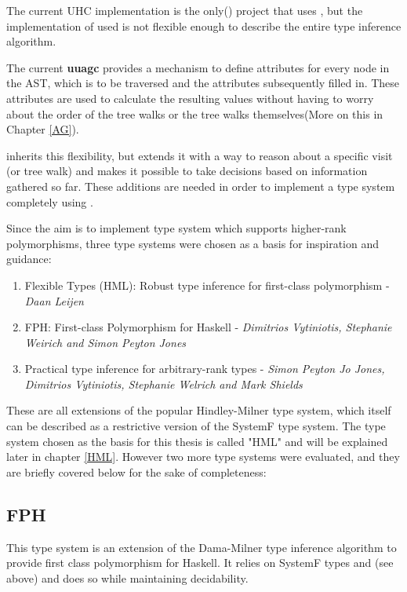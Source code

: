 The current UHC implementation is the only(\cite{UHC}) project that uses \ags, but the implementation of \ags used is not flexible enough to describe the entire type inference algorithm.

The current \textbf{uuagc} provides a mechanism to define attributes for every node in the AST, which is to be traversed and the attributes subsequently filled in. These attributes are used to calculate the resulting values without having to worry about the order of the tree walks or the tree walks themselves(More on this in Chapter \ref{AG}).

\Rcore inherits this flexibility, but extends it with a way to reason about a specific visit (or tree walk) and makes it possible to take decisions based on information gathered so far. These additions are needed in order to implement a type system completely using \ags.

Since the aim is to implement type system which supports higher-rank polymorphisms, three type systems were chosen as a basis for inspiration and guidance:

\begin{enumerate}
\item Flexible Types (HML): Robust type inference for first-class polymorphism - \textit{Daan Leijen}
\item FPH: First-class Polymorphism for Haskell - \textit{Dimitrios Vytiniotis, Stephanie Weirich and Simon Peyton Jones}
\item Practical type inference for arbitrary-rank types - \textit{Simon Peyton Jo Jones, Dimitrios Vytiniotis, Stephanie Welrich and Mark Shields}
\end{enumerate}

These are all extensions of the popular Hindley-Milner type system, which itself can be described as a restrictive version of the SystemF type system.
The type system chosen as the basis for this thesis is called "HML" and will be explained later in chapter \ref{HML}. However two more type systems were evaluated, and they are briefly covered below for the sake of completeness:

\subsection{FPH\cite{FPH}}
This type system is an extension of the Dama-Milner type inference algorithm to provide first class polymorphism for Haskell. It relies on SystemF types and (see above) and does so while maintaining decidability. 

